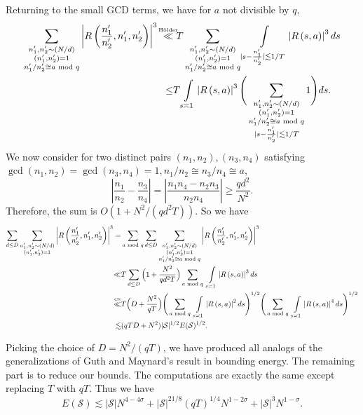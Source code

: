 Returning to the small GCD terms, we have for $a$ not divisible by $q$,
\begin{align*}
    \sum_{\substack{n_1',n_2'\sim (N/d)\\(n_1',n_2')=1\\n_1'/n_2'\cong a \mod q}}  \left|R\left(\frac{n_1'}{n_2'} ,n_1',n_2'\right) \right|^3
   \  \stackon{H\"older}{\ll}& \  T \sum_{\substack{n_1',n_2'\sim (N/d)\\(n_1',n_2')=1\\n_1'/n_2'\cong a \mod q}}\int\displaylimits_{|s-\frac{n_1'}{n_2'}|\lesssim 1/T}\left|R\left(s,a\right) \right|^3 ds\\
    \leq& T \int\displaylimits_{s\asymp 1} \left|R\left(s,a\right) \right|^3 \Bigg(\sum_{\substack{n_1',n_2'\sim (N/d)\\(n_1',n_2')=1\\n_1'/n_2'\cong a \mod q\\|s-\frac{n_1'}{n_2'}|\lesssim 1/T}} 1\Bigg)ds .
\end{align*}
We now consider for two distinct pairs $(n_1,n_2), (n_3,n_4)$ satisfying $\gcd(n_1,n_2)=\gcd(n_3,n_4)=1, n_1/n_2\cong n_3/n_4\cong a$, \[
\left|\frac{n_1}{n_2}-\frac{n_3}{n_4}\right|=\left|\frac{n_1n_4-n_2n_3}{n_2n_4}\right|\geq \frac{qd^2}{N^2}.
\]
Therefore, the sum is $O(1+{N^2}/({qd^2T}))$. So we have \begin{align*}
    \sum_{d\leq D}\sum_{\substack{n_1',n_2'\sim (N/d)\\(n_1',n_2')=1}}  \left|R\left(\frac{n_1'}{n_2'} ,n_1',n_2'\right) \right|^3 = &
   \sum_{a \mod q} \sum_{d\leq D}\sum_{\substack{n_1',n_2'\sim (N/d)\\(n_1',n_2')=1\\n_1'/n_2'\cong a \mod q}}  \left|R\left(\frac{n_1'}{n_2'} ,n_1',n_2'\right) \right|^3\\
   \ll& T \sum_{d\leq D}\Big(1+\frac{N^2}{qd^2T}\Big) \sum_{a \mod q}\ \int\displaylimits_{s\asymp 1} \left|R\left(s,a\right) \right|^3 ds\\
   \stackon{CS}{\ll}&T \Big(D+\frac{N^2}{qT}\Big)\Bigg(\sum_{a \mod q}\ \int\displaylimits_{s\asymp 1} \left|R\left(s,a\right) \right|^2 ds\Bigg)^{1/2}\Bigg(\sum_{a \mod q}\ \int\displaylimits_{s\asymp 1} \left|R\left(s,a\right) \right|^4 ds\Bigg)^{1/2}\\
   \lesssim& (qTD+N^2)|\mathcal{S}|^{1/2}E(\mathcal{S})^{1/2}.
\end{align*}

Picking the choice of $D=N^2/(qT)$, we have produced all analogs of the generalizations of Guth and Maynard's result in bounding energy. The remaining part is to reduce our bounds. The computations are exactly the same except replacing $T$ with $qT$. Thus we have \[
E(\mathcal{S})\lesssim |\mathcal{S}|N^{4-4\sigma}+|\mathcal{S}|^{21/8}(qT)^{1/4}N^{1-2\sigma}+|\mathcal{S}|^3N^{1-\sigma}.
\]